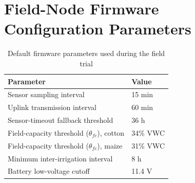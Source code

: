 \chapter{Field-Node Firmware Configuration Parameters}

\begin{table}[H]
\centering
\caption{Default firmware parameters used during the field trial}
\begin{tabularx}{\textwidth}{@{}lX@{}}
\toprule
\rowcolor{cairoblue!10}
\textbf{Parameter} & \textbf{Value} \\
\midrule
Sensor sampling interval & 15 min \\
Uplink transmission interval & 60 min \\
Sensor-timeout fallback threshold & 36 h \\
Field-capacity threshold ($\theta_{fc}$), cotton & 34\% VWC \\
Field-capacity threshold ($\theta_{fc}$), maize & 31\% VWC \\
Minimum inter-irrigation interval & 8 h \\
Battery low-voltage cutoff & 11.4 V \\
\bottomrule
\end{tabularx}
\end{table}
